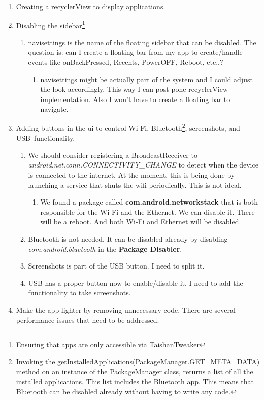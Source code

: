 \begin{enumerate}
\begin{enumerate}
          \end{enumerate}
    \item Creating a recyclerView to display applications.
    \item Disabling the sidebar\footnote{\label{sidebar} Ensuring that apps are only accessible via TaishanTweaker}
        \begin{enumerate}
            \item {\gls{navisettings} is the name of the floating sidebar that can be disabled. The question is: can I create a floating bar from my app to create/handle events like onBackPressed, Recents, PowerOFF, Reboot, etc..?}
            \begin{enumerate}
                \item{\gls{navisettings} might be actually part of the system and I could adjust the look accordingly. This way I can post-pone recyclerView implementation. Also I won't have to create a floating bar to navigate.}
            \end{enumerate}
        \end{enumerate}
    \item Adding buttons in the \gls{ui} to control Wi-Fi\faWifi, Bluetooth\faBluetooth \footnote{\label{blue-not-needed} Invoking the getInstalledApplications(PackageManager.GET\_META\_DATA) method on an instance of the PackageManager class, returns a list of all the installed applications. This list includes the Bluetooth app. This means that Bluetooth can be disabled already without having to write any code.}, screenshots, and USB\faHdd \ functionality.
    \begin{enumerate}
        \item We should consider registering a BroadcastReceiver to \emph{android.net.conn.CONNECTIVITY\_CHANGE} to detect when the device is connected to the internet. At the moment, this is being done by launching a service that shuts the wifi periodically. This is not ideal.
        \begin{enumerate}
            \item{We found a package called \textbf{com.android.networkstack} that is both responsible for the Wi-Fi and the Ethernet. We can disable it. There will be a reboot. And both Wi-Fi and Ethernet will be disabled.}
        \end{enumerate}
        \item Bluetooth is not needed. It can be disabled already by disabling \emph{com.android.bluetooth} in the \textbf{Package Disabler}.
        \item Screenshots is part of the USB button. I need to split it.
        \item USB has a proper button now to enable/disable it. I need to add the functionality to take screenshots.
    \end{enumerate}
    \item Make the app lighter by removing unnecessary code. There are several performance issues that need to be addressed.
\end{enumerate}

